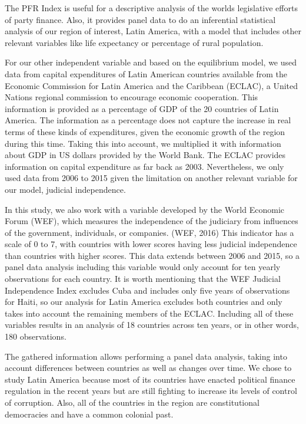 \documentclass[12,twoside]{article}
\begin{document}
The PFR Index is useful for a descriptive analysis of the worlds
legislative efforts of party finance. Also, it provides panel data to do
an inferential statistical analysis of our region of interest, Latin
America, with a model that includes other relevant variables like life
expectancy or percentage of rural population.

For our other independent variable and based on the equilibrium model,
we used data from capital expenditures of Latin American countries
available from the Economic Commission for Latin America and the
Caribbean (ECLAC), a United Nations regional commission to encourage
economic cooperation. This information is provided as a percentage of
GDP of the 20 countries of Latin America. The information as a
percentage does not capture the increase in real terms of these kinds of
expenditures, given the economic growth of the region during this time.
Taking this into account, we multiplied it with information about GDP in
US dollars provided by the World Bank. The ECLAC provides information on
capital expenditure as far back as 2003. Nevertheless, we only used data
from 2006 to 2015 given the limitation on another relevant variable for
our model, judicial independence.

In this study, we also work with a variable developed by the World
Economic Forum (WEF), which measures the independence of the judiciary
from influences of the government, individuals, or companies. (WEF,
2016) This indicator has a scale of 0 to 7, with countries with lower
scores having less judicial independence than countries with higher
scores. This data extends between 2006 and 2015, so a panel data
analysis including this variable would only account for ten yearly
observations for each country. It is worth mentioning that the WEF
Judicial Independence Index excludes Cuba and includes only five years
of observations for Haiti, so our analysis for Latin America excludes
both countries and only takes into account the remaining members of the
ECLAC. Including all of these variables results in an analysis of 18
countries across ten years, or in other words, 180 observations.

The gathered information allows performing a panel data analysis, taking
into account differences between countries as well as changes over time.
We chose to study Latin America because most of its countries have
enacted political finance regulation in the recent years but are still
fighting to increase its levels of control of corruption. Also, all of
the countries in the region are constitutional democracies and have a
common colonial past.
\end{document}
